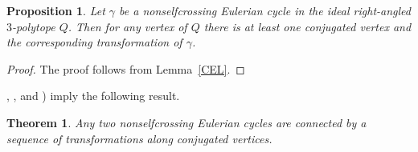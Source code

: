 \documentclass[12pt]{amsart}
\newtheorem{proposition}[formula]{Proposition}
\newtheorem{theorem}[formula]{Theorem}
\theoremstyle{definition}
\theoremstyle{remark}
\begin{document}
\begin{proposition}
Let $\gamma$ be a nonselfcrossing Eulerian cycle in the ideal right-angled $3$-polytope $Q$.
Then for any vertex of $Q$ there is at least one conjugated vertex and the corresponding transformation of $\gamma$.		
\end{proposition}
\begin{proof}
The proof follows from Lemma~\ref{CEL}.
\end{proof}
\cite[Theorem 17]{K68b}, \cite[Corollary 2]{FSW92}, \cite[Assertion before Section 3]{I11} and \cite[Theorem 2.22]{IM09}) 
imply the following result.
\begin{theorem}
Any two nonselfcrossing Eulerian cycles are connected by a sequence of transformations along conjugated vertices.
\end{theorem}
\end{document}
